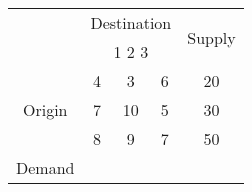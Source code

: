 \begin{tabular}{cc|c|c|c}
        & \multicolumn{3}{c}{Destination} & \multirow{2}{*}{Supply} \\
        & \multicolumn{3}{c}{1  2  3} &  \\ \cline{2-4}
        \multirow{3}{*}{Origin} 
        & 4 & 3 & 6 & 20 \\ \cline{2-4}
        & 7 & 10 & 5 & 30 \\ \cline{2-4}
        & 8 & 9 & 7 & 50 \\ \cline{2-4}
        Demand & \multicolumn{3}{c|}{} 30 \\
    \end{tabular}